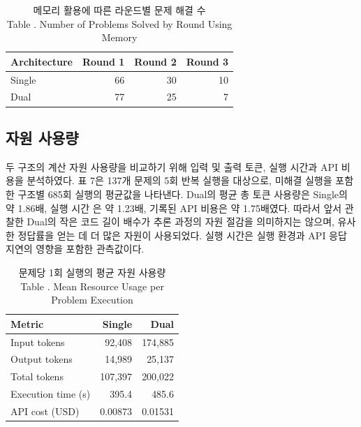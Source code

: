 \documentclass[a4paper,9pt,twocolumn]{extarticle}
\begin{document}
\begin{table}[htbp]\centering\footnotesize
\caption{메모리 활용에 따른 라운드별 문제 해결 수\\Table \thetable. Number of Problems Solved by Round Using Memory}\label{tab:memory}
\setlength{\tabcolsep}{4pt}\renewcommand{\arraystretch}{1.2}
\begin{tabularx}{\columnwidth}{>{\raggedright\arraybackslash}Xrrr}
\toprule
Architecture & Round 1 & Round 2 & Round 3 \\
\midrule
Single & 66 & 30 & 10 \\
Dual & 77 & 25 & 7 \\
\bottomrule
\end{tabularx}

\end{table}

\subsection{자원 사용량}


두 구조의 계산 자원 사용량을 비교하기 위해 입력 및 출력 토큰, 실행 시간과 API 비용을 분석하였다. 표 7은 137개 문제의 5회 반복 실행을 대상으로, 미해결 실행을 포함한 구조별 685회 실행의 평균값을 나타낸다. Dual의 평균 총 토큰 사용량은 Single의 약 1.86배, 실행 시간 은 약 1.23배, 기록된 API 비용은 약 1.75배였다. 따라서 앞서 관찰한 Dual의 작은 코드 길이 배수가 추론 과정의 자원 절감을 의미하지는 않으며, 유사한 정답률을 얻는 데 더 많은 자원이 사용되었다. 실행 시간은 실행 환경과 API 응답 지연의 영향을 포함한 관측값이다.

\begin{table}[htbp]\centering\footnotesize
\caption{문제당 1회 실행의 평균 자원 사용량\\Table \thetable. Mean Resource Usage per Problem Execution}\label{tab:resources}
\setlength{\tabcolsep}{4pt}\renewcommand{\arraystretch}{1.2}
\begin{tabularx}{\columnwidth}{>{\raggedright\arraybackslash}Xrr}
\toprule
Metric & Single & Dual \\
\midrule
Input tokens & 92,408 & 174,885 \\
Output tokens & 14,989 & 25,137 \\
Total tokens & 107,397 & 200,022 \\
Execution time (s) & 395.4 & 485.6 \\
API cost (USD) & 0.00873 & 0.01531 \\
\bottomrule
\end{tabularx}
\end{table}
\end{document}
